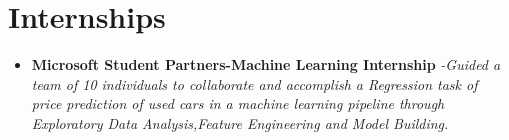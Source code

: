 \documentclass{article}
\begin{document}
\section*{Internships}
    \begin{itemize}
        \item{\textbf{\large{Microsoft Student Partners-Machine Learning Internship}}}
        \newline
        \textit{-Guided a team of 10 individuals to collaborate and accomplish a Regression task of price prediction of used cars in a machine learning pipeline through Exploratory Data Analysis,Feature Engineering and Model Building.}
    \end{itemize}
\end{document}
